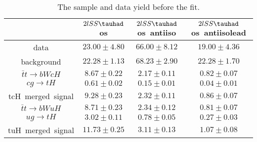 \begin{table}
\footnotesize
\caption{The sample and data yield before the fit.}
\centering
\begin{tabular}{|c|c|c|c|} \hline
 & $2lSS\tauhad$ os & $2lSS\tauhad$ os~antiiso & $2lSS\tauhad$ os~antiisolead\\\hline
data & $23.00\pm4.80$ & $66.00\pm8.12$ & $19.00\pm4.36$\\\hline
background & $22.28\pm1.13$ & $68.23\pm2.90$ & $22.28\pm1.70$\\\hline
$\bar{t}t\to bWcH$ & $8.67\pm0.22$ & $2.17\pm0.11$ & $0.82\pm0.07$\\\hline
$cg\to tH$ & $0.61\pm0.02$ & $0.15\pm0.01$ & $0.04\pm0.01$\\\hline
tcH~merged~signal & $9.28\pm0.23$ & $2.32\pm0.11$ & $0.86\pm0.07$\\\hline
$\bar{t}t\to bWuH$ & $8.71\pm0.23$ & $2.34\pm0.12$ & $0.81\pm0.07$\\\hline
$ug\to tH$ & $3.02\pm0.11$ & $0.78\pm0.05$ & $0.27\pm0.03$\\\hline
tuH~merged~signal & $11.73\pm0.25$ & $3.11\pm0.13$ & $1.07\pm0.08$\\\hline
\end{tabular}
\label{tab:yield}
\end{table}
